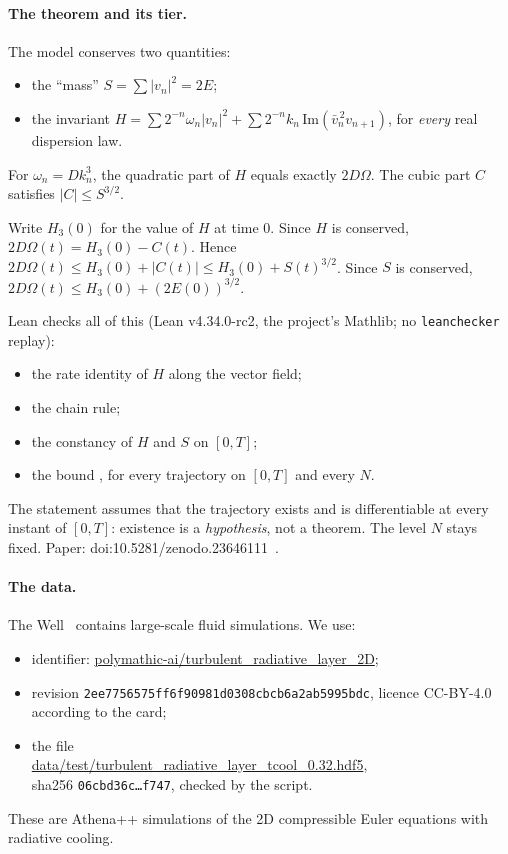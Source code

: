 \paragraph{The theorem and its tier.} The model conserves two quantities:
\begin{itemize}
\item the ``mass'' $S=\sum|v_n|^2=2E$;
\item the invariant $H=\sum2^{-n}\omega_n|v_n|^2+\sum2^{-n}k_n\,\mathrm{Im}(\bar v_n^{\,2}v_{n+1})$, for \emph{every}
real dispersion law.
\end{itemize}
For $\omega_n=Dk_n^3$, the quadratic part of $H$ equals exactly $2D\Omega$. The cubic part $C$ satisfies
$|C|\le S^{3/2}$.
\begin{humanproof}
Write $H_3(0)$ for the value of $H$ at time $0$. Since $H$ is conserved, $2D\Omega(t)=H_3(0)-C(t)$. Hence
$2D\Omega(t)\le H_3(0)+|C(t)|\le H_3(0)+S(t)^{3/2}$. Since $S$ is conserved,
$2D\Omega(t)\le H_3(0)+(2E(0))^{3/2}$.
\end{humanproof}
Lean checks all of this \tierAs{} (Lean v4.34.0-rc2, the project's Mathlib; no \texttt{leanchecker} replay):
\begin{itemize}
\item the rate identity of $H$ along the vector field;
\item the chain rule;
\item the constancy of $H$ and $S$ on $[0,T]$;
\item the bound , for every trajectory on $[0,T]$ and every $N$.
\end{itemize}
\begingroup\sloppy The statement assumes that the trajectory exists and is differentiable at every instant of $[0,T]$: existence is
a \emph{hypothesis}, not a theorem. The level $N$ stays fixed. Paper: doi:10.5281/zenodo.23646111~\cite{ch5:sigma3}.\par\endgroup
\paragraph{The data.} The Well~\cite{ch5:thewell} contains large-scale fluid simulations. We
use:
\begin{itemize}
\item identifier: \url{polymathic-ai/turbulent_radiative_layer_2D};
\item revision \texttt{2ee7756575ff6f90981d0308cbcb6a2ab5995bdc}, licence CC-BY-4.0 according to the card;
\item the file\\ \url{data/test/turbulent_radiative_layer_tcool_0.32.hdf5},\\ sha256 \texttt{06cbd36c\dots f747},
checked by the script.
\end{itemize}
These are Athena++ simulations of the 2D compressible Euler equations with radiative cooling.

